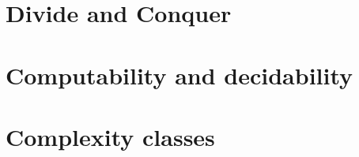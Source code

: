









\tableofcontents
\newpage
{}





\part{Divide and Conquer}














\part{Computability and decidability}

\part{Complexity classes}

